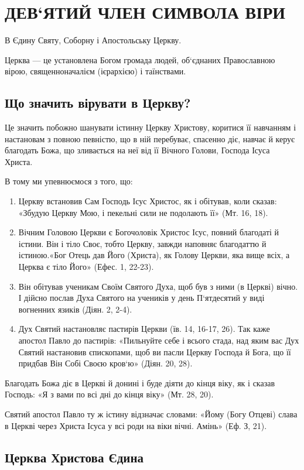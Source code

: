 \documentclass[main.tex]{subfiles}
\begin{document}
\section{ДЕВ`ЯТИЙ ЧЛЕН СИМВОЛА ВІРИ} 
В Єдину Святу, Соборну і Апостольську Церкву.

Церква — це установлена Богом громада людей, об`єднаних Православною вірою, священноначалієм (ієрархією) і таїнствами.

\subsection{Що значить вірувати в Церкву?}

Це значить побожно шанувати істинну Церкву Христову, коритися її навчанням і настановам з повною певністю, що в ній перебуває, спасенно діє, навчає й керує благодать Божа, що зливається на неї від її Вічного Голови, Господа Ісуса Христа.

В тому ми упевнюємося з того, що:
\begin{enumerate}
    \item Церкву встановив Сам Господь Ісус Христос, як і обітував, коли сказав: «Збудую Церкву Мою, і пекельні сили не подолають її» (Мт. 16, 18).
    \item Вічним Головою Церкви є Богочоловік Христос Ісус, повний благодаті й істини. Він і тіло Своє, тобто Церкву, завжди наповняє благодаттю й істиною.«Бог Отець дав Його (Христа), як Голову Церкви, яка вище всіх, а Церква є тіло Його» (Ефес. 1, 22-23).
    \item Він обітував ученикам Своїм Святого Духа, щоб був з ними (в Церкві) вічно. І дійсно послав Духа Святого на учеників у день П`ятдесятий у виді вогненних язиків (Діян. 2, 2-4).
    
    \item Дух Святий настановляє пастирів Церкви (їв. 14, 16-17, 26). Так каже апостол Павло до пастирів: «Пильнуйте себе і всього стада, над яким вас Дух Святий настановив єпископами, щоб ви пасли Церкву Господа й Бога, що її придбав Він Собі Своєю кров`ю» (Діян. 20, 28). 
\end{enumerate}

Благодать Божа діє в Церкві й донині і буде діяти до кінця віку, як і сказав Господь: «Я з вами по всі дні до кінця віку» (Мт. 28, 20).

Святий апостол Павло ту ж істину відзначає словами: «Йому (Богу Отцеві) слава в Церкві через Христа Ісуса у всі роди на віки вічні. Амінь» (Еф. З, 21).
\subsection{Церква Христова Єдина}
\end{document}
